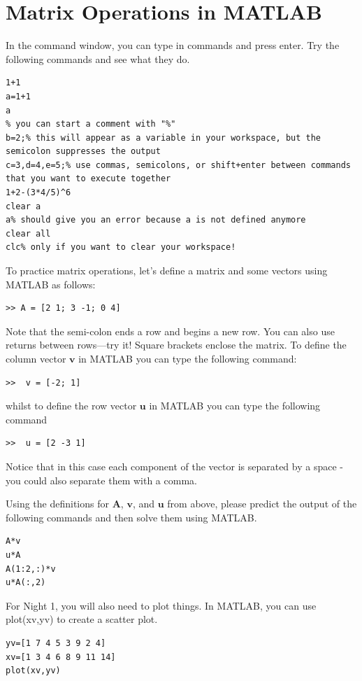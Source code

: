 \section{Matrix Operations in MATLAB}
\begin{prob}
In the command window, you can type in commands and press enter. Try the following commands and see what they do.
\begin{lstlisting}
1+1
a=1+1
a
% you can start a comment with "%"
b=2;% this will appear as a variable in your workspace, but the semicolon suppresses the output
c=3,d=4,e=5;% use commas, semicolons, or shift+enter between commands that you want to execute together
1+2-(3*4/5)^6
clear a
a% should give you an error because a is not defined anymore
clear all
clc% only if you want to clear your workspace!
\end{lstlisting}
\end{prob}

To practice matrix operations, let's define a matrix and some vectors using MATLAB as follows:
\begin{lstlisting}
>> A = [2 1; 3 -1; 0 4]
\end{lstlisting}
Note that the semi-colon ends a row and begins a new row. You can also use returns between rows---try it! Square brackets enclose the matrix. To define the column vector $\mathbf{v}$ in MATLAB you can type the following command:
\begin{lstlisting}
>>  v = [-2; 1]
\end{lstlisting}
whilst to define the row vector $\mathbf{u}$ in MATLAB you can type the following command
\begin{lstlisting}
>>  u = [2 -3 1]
\end{lstlisting}
Notice that in this case each component of the vector is separated by a space - you could also separate them with a comma. 

\begin{prob}
Using the definitions for $\mathbf{A}$, $\mathbf{v}$, and $\mathbf{u}$ from above, please predict the output of the following commands and then solve them using MATLAB.

\begin{lstlisting}
A*v
u*A
A(1:2,:)*v
u*A(:,2)
\end{lstlisting}
\end{prob}

For Night 1, you will also need to plot things. In MATLAB, you can use plot(xv,yv) to create a scatter plot.
\begin{lstlisting}
yv=[1 7 4 5 3 9 2 4]
xv=[1 3 4 6 8 9 11 14]
plot(xv,yv)
\end{lstlisting}

